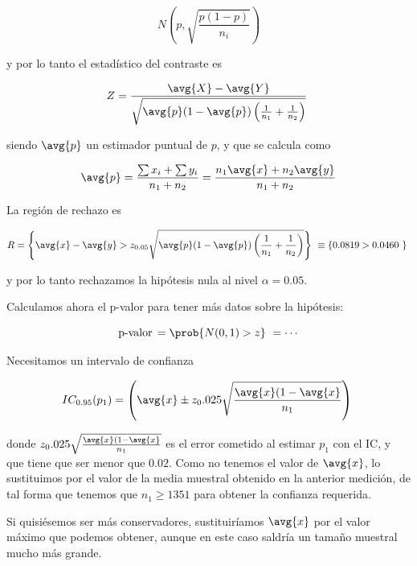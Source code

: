\begin{problem}[4]
\[ N\left(p, \sqrt{\frac{p(1-p)}{n_i}}\right) \]

y por lo tanto el estadístico del contraste es

\[ Z = \frac{\avg{X} - \avg{Y}}{\sqrt{\avg{p}(1-\avg{p})\left(\frac{1}{n_1}+\frac{1}{n_2}\right)}} \]

siendo $\avg{p}$ un estimador puntual de $p$, y que se calcula como 

\[ \avg{p} = \frac{\sum x_i + \sum y_i}{n_1 + n_2} = \frac{n_1\avg{x} + n_2\avg{y}}{n_1 + n_2} \]

La región de rechazo es

\[ R = \left\{ \avg{x} - \avg{y} > z_{0.05}\sqrt{\avg{p}(1-\avg{p})\left(\frac{1}{n_1}+\frac{1}{n_2}\right)} \right\} \equiv \{ 0.0819 > 0.0460 \} \]

y por lo tanto rechazamos la hipótesis nula al nivel $\alpha=0.05$.

Calculamos ahora el p-valor para tener más datos sobre la hipótesis:

\[ \text{p-valor}\, = \prob{N(0,1) > z} = \dotsb \]

\spart Necesitamos un intervalo de confianza

\[ IC_{0.95}(p_1) = \left(\avg{x} \pm z_0.025\sqrt{\frac{\avg{x}(1-\avg{x}}{n_1}}\right) \]

donde $z_0.025\sqrt{\frac{\avg{x}(1-\avg{x}}{n_1}}$ es el error cometido al estimar $p_1$ con el IC, y que tiene que ser menor que $0.02$. Como no tenemos el valor de $\avg{x}$, lo sustituimos por el valor de la media muestral obtenido en la anterior medición, de tal forma que tenemos que $n_1\geq1351$ para obtener la confianza requerida. 

Si quisiésemos ser más conservadores, sustituiríamos $\avg{x}$ por el valor máximo que podemos obtener, aunque en este caso saldría un tamaño muestral mucho más grande.

\end{problem}


